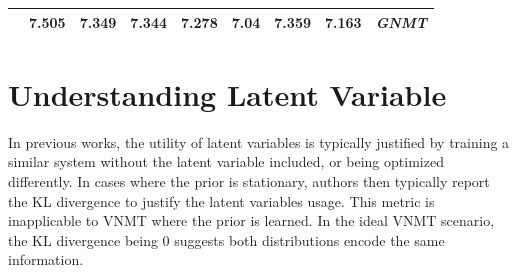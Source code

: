 \begin{table}[]
\begin{tabular}{lllllllll}
	\rowcolor[HTML]{F4DAD8} 
	\multicolumn{1}{|l|}{\cellcolor[HTML]{F4DAD8}\textit{IAF}}    & \multicolumn{1}{l|}{\multirow{-2}{*}{\cellcolor[HTML]{F4DAD8}\textbf{7.505}}} & \multicolumn{1}{l|}{\cellcolor[HTML]{F4DAD8}7.349}          & \multicolumn{1}{l|}{\cellcolor[HTML]{F4DAD8}7.344} & \multicolumn{1}{l|}{\cellcolor[HTML]{F4DAD8}7.278} & \multicolumn{1}{l|}{\cellcolor[HTML]{F4DAD8}7.04}           & \multicolumn{1}{l|}{\cellcolor[HTML]{F4DAD8}7.359}          & \multicolumn{1}{l|}{\multirow{-2}{*}{\cellcolor[HTML]{F4DAD8} 7.163}}  & \multicolumn{1}{l|}{\multirow{-2}{*}{\cellcolor[HTML]{F4DAD8}\textit{GNMT}}} \\ \hline
\end{tabular}
\end{table}

\section{Understanding Latent Variable} 



In previous works, the utility of latent variables is typically justified by training a similar system without the latent variable included, or being optimized differently.  In cases where the prior is stationary, authors then typically report the KL divergence to justify the latent variables usage. This metric is inapplicable to \ac{VNMT} where the prior is learned. In the ideal \ac{VNMT} scenario, the KL divergence being 0 suggests both distributions encode the same information.

